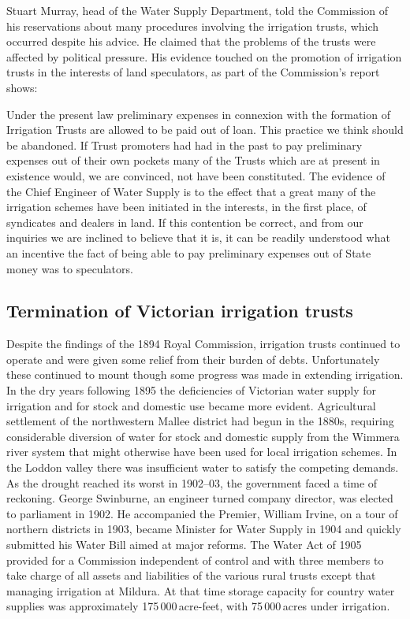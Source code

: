 Stuart Murray, head of the Water Supply Department,
told the Commission of his reservations about many procedures
involving the irrigation trusts, which occurred despite his advice.
He claimed that the problems of the trusts were affected by political
pressure.  His evidence touched on the promotion of irrigation trusts
in the interests of land speculators, as part of the Commission's
report shows:
\begin{Quote}
	Under the present law preliminary expenses in connexion with
	the formation of Irrigation Trusts are allowed to be paid out
	of loan.  This practice we think should be abandoned.  If
	Trust promoters had had in the past to pay preliminary
	expenses out of their own pockets many of the Trusts which are
	at present in existence would, we are convinced, not have been
	constituted.  The evidence of the Chief Engineer of Water
	Supply is to the effect that a great many of the irrigation
	schemes have been initiated in the interests, in the first
	place, of syndicates and dealers in land.  If this contention
	be correct, and from our inquiries we are inclined to believe
	that it is, it can be readily understood what an incentive the
	fact of being able to pay preliminary expenses out of State
	money was to speculators.
\end{Quote}

\subsection*{Termination of Victorian irrigation trusts}

Despite the findings of the 1894 Royal Commission, irrigation trusts
continued to operate and were given some relief from their burden of
debts.  Unfortunately these continued to mount though some progress
was made in extending irrigation.  In the dry years following 1895 the
deficiencies of Victorian water supply for irrigation and for stock
and domestic use became more evident.  Agricultural settlement of the
northwestern Mallee  district had begun in the
1880s, requiring considerable diversion of water for stock and
domestic supply from the Wimmera river system
that might otherwise have been used for local irrigation schemes.  In
the Loddon valley there was insufficient water to satisfy the
competing demands.  As the drought reached its worst in
1902--03, the government faced a time of reckoning.  George Swinburne,
 an engineer turned company director, was elected
to parliament in 1902.  He accompanied the Premier, William Irvine,
 on a tour of northern districts in 1903, became
Minister for Water Supply in 1904 and quickly submitted his Water Bill
aimed at major reforms.  The Water Act  of 1905 provided for a Commission independent of control and
with three members to take charge of all assets and liabilities of the
various rural trusts except that managing irrigation at Mildura.  At
that time storage capacity for country water supplies was
approximately 175\,000\,acre-feet, with 75\,000\,acres under
irrigation.

